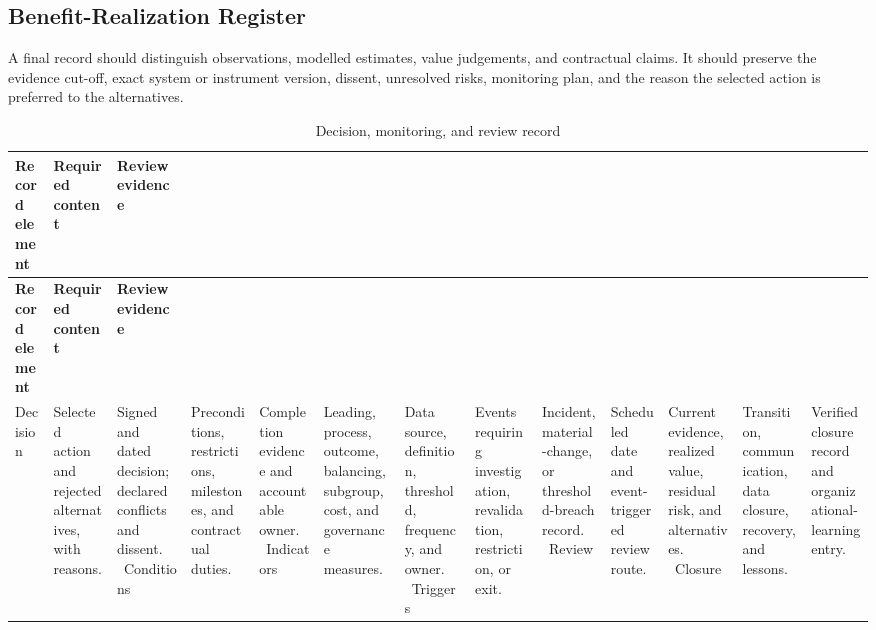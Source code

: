 \subsection{Benefit-Realization Register}
\label{sec:comp-ch06-supp-3}
A final record should distinguish observations, modelled estimates, value
judgements, and contractual claims. It should preserve the evidence cut-off, exact
system or instrument version, dissent, unresolved risks, monitoring plan, and the
reason the selected action is preferred to the alternatives.

\begin{longtable}{@{}p{}p{}p{}@{}}
\caption{Decision, monitoring, and review record}
\label{tab:comp-ch06-decision-record}\\
\toprule
\textbf{Record element} & \textbf{Required content} & \textbf{Review evidence} \\
\midrule
\endfirsthead
\toprule
\textbf{Record element} & \textbf{Required content} & \textbf{Review evidence} \\
\midrule
\endhead
\bottomrule
\endlastfoot
Decision & Selected action and rejected alternatives, with reasons. & Signed and dated decision; declared conflicts and dissent. \
Conditions & Preconditions, restrictions, milestones, and contractual duties. & Completion evidence and accountable owner. \
Indicators & Leading, process, outcome, balancing, subgroup, cost, and governance measures. & Data source, definition, threshold, frequency, and owner. \
Triggers & Events requiring investigation, revalidation, restriction, or exit. & Incident, material-change, or threshold-breach record. \
Review & Scheduled date and event-triggered review route. & Current evidence, realized value, residual risk, and alternatives. \
Closure & Transition, communication, data closure, recovery, and lessons. & Verified closure record and organizational-learning entry. \
\end{longtable}
